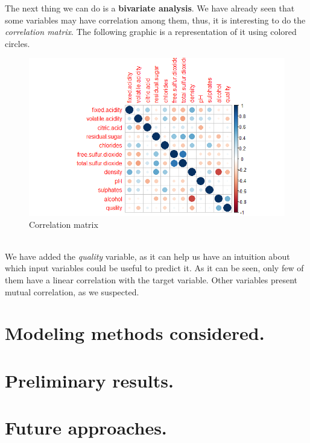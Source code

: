 \documentclass[10pt]{article}
\begin{document}
The next thing we can do is a \textbf{bivariate analysis}. We have already seen that some variables may have correlation among them, thus, it is interesting to do the \textit{correlation matrix}. The following graphic is a representation of it using colored circles. \\
\begin{figure}[H]
\centering
\caption{Correlation matrix}
\includegraphics[scale=0.5]{matrix_correlation_circles}
\end{figure}
\ \\
We have added the \textit{quality} variable, as it can help us have an intuition about which input variables could be useful to predict it. As it can be seen, only few of them have a linear correlation with the target variable. Other variables present mutual correlation, as we suspected.

\section{Modeling methods considered.}

\section{Preliminary results.}

\section{Future approaches.}
\end{document}
